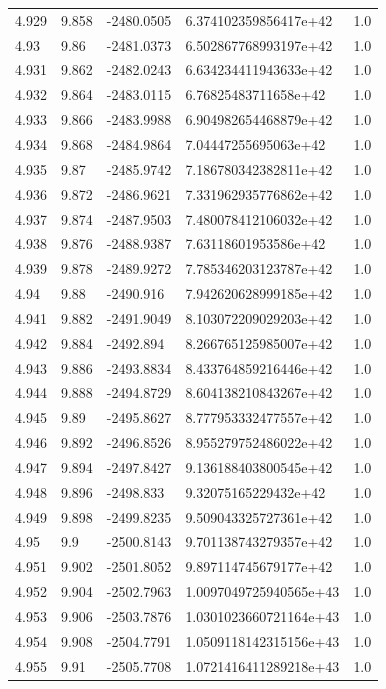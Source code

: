 \begin{tabular}{lllll}
4.929 & 9.858 & -2480.0505 & 6.374102359856417e+42 & 1.0 \\
4.93 & 9.86 & -2481.0373 & 6.502867768993197e+42 & 1.0 \\
4.931 & 9.862 & -2482.0243 & 6.634234411943633e+42 & 1.0 \\
4.932 & 9.864 & -2483.0115 & 6.76825483711658e+42 & 1.0 \\
4.933 & 9.866 & -2483.9988 & 6.904982654468879e+42 & 1.0 \\
4.934 & 9.868 & -2484.9864 & 7.04447255695063e+42 & 1.0 \\
4.935 & 9.87 & -2485.9742 & 7.186780342382811e+42 & 1.0 \\
4.936 & 9.872 & -2486.9621 & 7.331962935776862e+42 & 1.0 \\
4.937 & 9.874 & -2487.9503 & 7.480078412106032e+42 & 1.0 \\
4.938 & 9.876 & -2488.9387 & 7.63118601953586e+42 & 1.0 \\
4.939 & 9.878 & -2489.9272 & 7.785346203123787e+42 & 1.0 \\
4.94 & 9.88 & -2490.916 & 7.942620628999185e+42 & 1.0 \\
4.941 & 9.882 & -2491.9049 & 8.103072209029203e+42 & 1.0 \\
4.942 & 9.884 & -2492.894 & 8.266765125985007e+42 & 1.0 \\
4.943 & 9.886 & -2493.8834 & 8.433764859216446e+42 & 1.0 \\
4.944 & 9.888 & -2494.8729 & 8.604138210843267e+42 & 1.0 \\
4.945 & 9.89 & -2495.8627 & 8.777953332477557e+42 & 1.0 \\
4.946 & 9.892 & -2496.8526 & 8.955279752486022e+42 & 1.0 \\
4.947 & 9.894 & -2497.8427 & 9.136188403800545e+42 & 1.0 \\
4.948 & 9.896 & -2498.833 & 9.32075165229432e+42 & 1.0 \\
4.949 & 9.898 & -2499.8235 & 9.509043325727361e+42 & 1.0 \\
4.95 & 9.9 & -2500.8143 & 9.701138743279357e+42 & 1.0 \\
4.951 & 9.902 & -2501.8052 & 9.897114745679177e+42 & 1.0 \\
4.952 & 9.904 & -2502.7963 & 1.0097049725940565e+43 & 1.0 \\
4.953 & 9.906 & -2503.7876 & 1.0301023660721164e+43 & 1.0 \\
4.954 & 9.908 & -2504.7791 & 1.0509118142315156e+43 & 1.0 \\
4.955 & 9.91 & -2505.7708 & 1.0721416411289218e+43 & 1.0 \\

\end{tabular}
